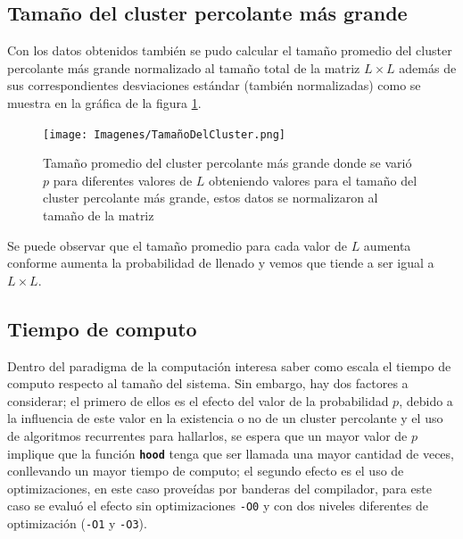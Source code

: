 \documentclass[11pt,twocolumn]{article}
\begin{document}
\subsection{\textbf{Tamaño del cluster percolante más grande}}
Con los datos obtenidos también se pudo calcular el tamaño promedio del cluster percolante más grande normalizado al tamaño total de la matriz $L\times L$ además de sus correspondientes desviaciones estándar (también normalizadas) como se muestra en la gráfica de la figura \ref{Tamaño}.

\begin{figure}[H]
    \texttt{[image: Imagenes/TamañoDelCluster.png]}
    \caption{Tamaño promedio del cluster percolante más grande donde se varió $p$ para diferentes valores de $L$ obteniendo valores para el tamaño del cluster percolante más grande, estos datos se normalizaron al tamaño de la matriz}
    \label{Tamaño}
\end{figure}

Se puede observar que el tamaño promedio para cada valor de $L$ aumenta conforme aumenta la probabilidad de llenado y vemos que tiende a ser igual a $L\times L$.

\subsection{\textbf{Tiempo de computo}}

Dentro del paradigma de la computación interesa saber como escala el tiempo de computo respecto al tamaño del sistema. Sin embargo, hay dos factores a considerar; el primero de ellos es el efecto del valor de la probabilidad $p$, debido a la influencia de este valor en la existencia o no de un cluster percolante y el uso de algoritmos recurrentes para hallarlos, se espera que un mayor valor de $p$ implique que la función \textbf{\texttt{hood}} tenga que ser llamada una mayor cantidad de veces, conllevando un mayor tiempo de computo; el segundo efecto es el uso de optimizaciones, en este caso proveídas por banderas del compilador, para este caso se evaluó el efecto sin optimizaciones \texttt{-O0} y con dos niveles diferentes de optimización (\texttt{-O1} y \texttt{-O3}). \\
\vspace{0.2 cm}
\end{document}
